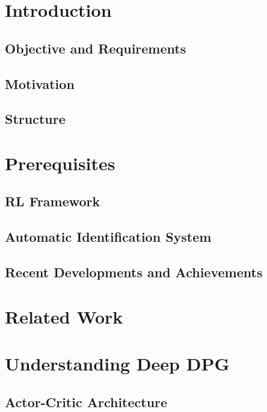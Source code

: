 \section{Introduction}
 \label{chap:intro}
    \subsection{Objective and Requirements}
    
    \subsection{Motivation}
    
    \subsection{Structure}
    
    
\newpage
\section{Prerequisites}
    \subsection{RL Framework}\label{chap:rlframework}
    
    \subsection{Automatic Identification System}
    
    \subsection{Recent Developments and Achievements}
    
\newpage
\section{Related Work}\label{chap:relatedWork}


\newpage
\section{Understanding Deep DPG}

    \subsection{Actor-Critic Architecture}
    
